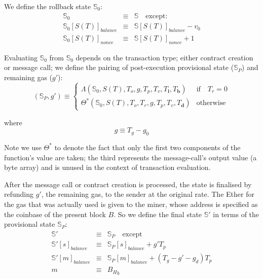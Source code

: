 \documentclass[9pt,oneside]{amsart}
\begin{document}
\begin{multicols}{2}
We define the rollback state $\mathbb{S}_0$:
\begin{eqnarray}
\mathbb{S}_0 & \equiv & \mathbb{S} \quad \text{except:} \\
\mathbb{S}_0[S(T)]_{balance} & \equiv & \mathbb{S}[S(T)]_{balance} - v_0 \\
\mathbb{S}_0[S(T)]_{nonce} & \equiv & \mathbb{S}[S(T)]_{nonce} + 1
\end{eqnarray}

Evaluating $\mathbb{S}_0$ from $\mathbb{S}_0$ depends on the transaction type; either contract creation or message call; we define the pairing of post-execution provisional state ($\mathbb{S}_P$) and remaining gas ($g'$):
\begin{equation}
(\mathbb{S}_P, g') \equiv \begin{cases}
\Lambda(\mathbb{S}_0, S(T), T_o, g, T_p, T_v, T_\mathbf{i}, T_\mathbf{b}) & \text{if} \quad T_r = 0 \\
\Theta^*(\mathbb{S}_0, S(T), T_o, T_r, g, T_p, T_v, T_\mathbf{d}) & \text{otherwise}
\end{cases}
\end{equation}

where
\begin{equation}
g \equiv T_g - g_0
\end{equation}

Note we use $\Theta^*$ to denote the fact that only the first two components of the function's value are taken; the third represents the message-call's output value (a byte array) and is unused in the context of transaction evaluation.

After the message call or contract creation is processed, the state is finalised by refunding $g'$, the remaining gas, to the sender at the original rate. The Ether for the gas that was actually used is given to the miner, whose address is specified as the coinbase of the present block $B$. So we define the final state $\mathbb{S}'$ in terms of the provisional state $\mathbb{S}_P$:
\begin{eqnarray}
\mathbb{S}' & \equiv & \mathbb{S}_P \quad \text{except} \\
\mathbb{S}'[s]_{balance} & \equiv & \mathbb{S}_P[s]_{balance} + g' T_p \\
\mathbb{S}'[m]_{balance} & \equiv & \mathbb{S}_P[m]_{balance} + (T_g - g' - g_d) T_p \\
m & \equiv & {B_H}_b
\end{eqnarray}



\end{multicols}
\end{document}

